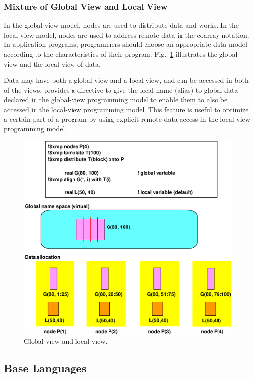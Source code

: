 \subsubsection{Mixture of Global View and Local View}

In the global-view model, nodes are used to distribute data and works. In the
local-view model, nodes are used to address remote data in the coarray
notation.
%
In application programs,
programmers should choose an appropriate data model according to the
characteristics of their program. Fig.~\ref{fig4} illustrates the global view
and the local view of data.

Data may have both a global view and a local view, and can be accessed
in both of the views. {\XMP} provides a directive to give the local name
(alias) to global data declared in the global-view programming model
to enable them to also be accessed in the local-view programming
model. This feature is useful to optimize a certain part of a program
by using explicit remote data access in the local-view programming
model.

\begin{figure}
  \centering
  \includegraphics[width=12cm]{figs/Fig4.eps}
  \caption{Global view and local view.}
  \label{fig4}
\end{figure}


\subsection{Base Languages}


